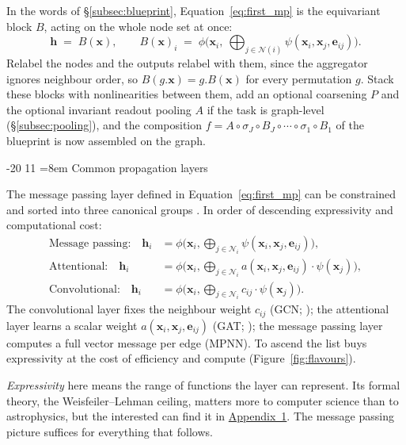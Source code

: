 \documentclass[graybox, envcountchap]{Template/svmult}
\makeatletter
\newif\ifarxiv
\newcommand{\pcite}[1]{\ifarxiv\citealp{#1}\else\citep{#1}\fi}%
\renewcommand\subsection{\@startsection{subsection}{2}{\z@}%
                       {-20\p@}%
                       {11\p@}%
                       {\normalfont\subsecsize\subsecstyle
                        \rightskip=\z@ \@plus 8em\pretolerance=10000 }}
\makeatother
\begin{document}
In the words of \S\ref{subsec:blueprint}, Equation~\ref{eq:first_mp} is the equivariant block $B$, acting on the whole node set at once:
\[
\mathbf{h} \;=\; B(\mathbf{x}), \qquad B(\mathbf{x})_i \;=\; \phi\!\Big(\mathbf{x}_i,\ \bigoplus_{j\in\mathcal{N}(i)}\psi(\mathbf{x}_i,\mathbf{x}_j,\mathbf{e}_{ij})\Big).
\]
Relabel the nodes and the outputs relabel with them, since the aggregator ignores neighbour order, so $B(g.\mathbf{x})=g.B(\mathbf{x})$ for every permutation $g$. Stack these blocks with nonlinearities between them, add an optional coarsening $P$ and the optional invariant readout pooling $A$ if the task is graph-level (\S\ref{subsec:pooling}), and the composition $f = A \circ \sigma_J \circ B_J \circ \cdots \circ \sigma_1 \circ B_1$ of the blueprint is now assembled on the graph.

\subsection{Common propagation layers}
\label{subsec:flavours}

The message passing layer defined in Equation~\ref{eq:first_mp} can be constrained and sorted into three canonical groups \citep{Bronstein2021_geometricDL_book, Velickovic2022_messagepassing_up}. In order of descending expressivity and computational cost:
\begin{align}
\text{Message passing:}\quad
  \mathbf{h}_i &= \phi\!\Big(\mathbf{x}_i, \textstyle\bigoplus_{j\in\mathcal{N}_i}
       \psi(\mathbf{x}_i,\mathbf{x}_j,\mathbf{e}_{ij})\Big),\\
\text{Attentional:}\quad
  \mathbf{h}_i &= \phi\!\Big(\mathbf{x}_i, \textstyle\bigoplus_{j\in\mathcal{N}_i}
       a(\mathbf{x}_i,\mathbf{x}_j, \mathbf{e}_{ij})\cdot\psi(\mathbf{x}_j)\Big), \\
\text{Convolutional:}\quad
  \mathbf{h}_i &= \phi\!\Big(\mathbf{x}_i, \textstyle\bigoplus_{j\in\mathcal{N}_i}
       c_{ij}\cdot\psi(\mathbf{x}_j)\Big).
\end{align}
The convolutional layer fixes the neighbour weight $c_{ij}$ (GCN; \pcite{Kipf2017_GCN_semisupervised}); the attentional layer learns a scalar weight $a(\mathbf{x}_i,\mathbf{x}_j,\mathbf{e}_{ij})$ (GAT; \pcite{Velickovic2018_GAT_attention}); the message passing layer computes a full vector message per edge (MPNN). To ascend the list buys expressivity at the cost of efficiency and compute (Figure~\ref{fig:flavours}).

\emph{Expressivity} here means the range of functions the layer can represent. Its formal theory, the Weisfeiler--Lehman ceiling, matters more to computer science than to astrophysics, but the interested can find it in \hyperref[app:sym:wl]{Appendix~1}. The message passing picture suffices for everything that follows.
\end{document}
